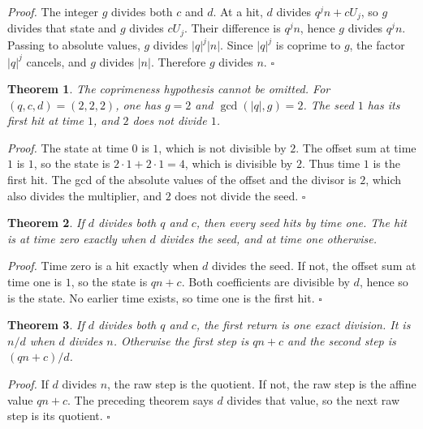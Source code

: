 \documentclass[11pt,letterpaper]{article}
\newtheorem{theorem}{Theorem}
\newenvironment{proof}{\noindent\textit{Proof.}}{\hfill\(\square\)}
\begin{document}
\begin{proof}
The integer \(g\) divides both \(c\) and \(d\). At a hit, \(d\) divides \(q^{j}n+cU_{j}\), so \(g\) divides that state and \(g\) divides \(cU_{j}\). Their difference is \(q^{j}n\), hence \(g\) divides \(q^{j}n\). Passing to absolute values, \(g\) divides \(\lvert q\rvert^{j}\lvert n\rvert\). Since \(\lvert q\rvert^{j}\) is coprime to \(g\), the factor \(\lvert q\rvert^{j}\) cancels, and \(g\) divides \(\lvert n\rvert\). Therefore \(g\) divides \(n\).
\end{proof}

\begin{theorem}
\label{thm:shared}
The coprimeness hypothesis cannot be omitted. For \((q,c,d)=(2,2,2)\), one has \(g=2\) and \(\gcd(\lvert q\rvert,g)=2\). The seed \(1\) has its first hit at time \(1\), and \(2\) does not divide \(1\).
\end{theorem}

\begin{proof}
The state at time \(0\) is \(1\), which is not divisible by \(2\). The offset sum at time \(1\) is \(1\), so the state is \(2\cdot 1+2\cdot 1=4\), which is divisible by \(2\). Thus time \(1\) is the first hit. The gcd of the absolute values of the offset and the divisor is \(2\), which also divides the multiplier, and \(2\) does not divide the seed.
\end{proof}

\begin{theorem}
\label{thm:both}
If \(d\) divides both \(q\) and \(c\), then every seed hits by time one. The hit is at time zero exactly when \(d\) divides the seed, and at time one otherwise.
\end{theorem}

\begin{proof}
Time zero is a hit exactly when \(d\) divides the seed. If not, the offset sum at time one is \(1\), so the state is \(q n+c\). Both coefficients are divisible by \(d\), hence so is the state. No earlier time exists, so time one is the first hit.
\end{proof}

\begin{theorem}
\label{thm:bothreturn}
If \(d\) divides both \(q\) and \(c\), the first return is one exact division. It is \(n/d\) when \(d\) divides \(n\). Otherwise the first step is \(qn+c\) and the second step is \((qn+c)/d\).
\end{theorem}

\begin{proof}
If \(d\) divides \(n\), the raw step is the quotient. If not, the raw step is the affine value \(qn+c\). The preceding theorem says \(d\) divides that value, so the next raw step is its quotient.
\end{proof}
\end{document}
